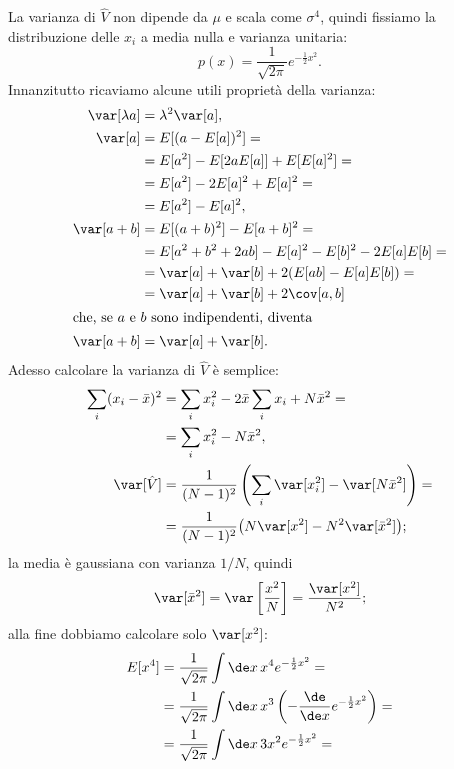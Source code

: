 \begin{solution}
	La varianza di $\hat V$ non dipende da $\mu$ e scala come $\sigma^4$,
	quindi fissiamo la distribuzione delle $x_i$ a media nulla e varianza unitaria:
	\begin{equation*}
		p(x) = \frac1{\sqrt{2\pi}} e^{-\frac12 x^2}.
	\end{equation*}
	Innanzitutto ricaviamo alcune utili proprietà della varianza:
	\begin{align*}
		\var[\lambda a] &= \lambda^2 \var[a], \\
		\var[a]
		&= E[(a-E[a])^2] = \\
		&= E[a^2] - E[2aE[a]] + E[E[a]^2] = \\
		&= E[a^2] - 2E[a]^2 + E[a]^2 = \\
		&= E[a^2] - E[a]^2, \\
		\var[a+b]
		&= E[(a+b)^2] - E[a+b]^2 = \\
		&= E[a^2 + b^2 + 2ab] - E[a]^2 - E[b]^2 - 2E[a]E[b] = \\
		&= \var[a] + \var[b] + 2(E[ab] - E[a]E[b]) = \\
		&= \var[a] + \var[b] + 2\cov[a,b] \\
		\intertext{che, se $a$ e $b$ sono indipendenti, diventa}
		\var[a+b] &= \var[a] + \var[b].
	\end{align*}
	Adesso calcolare la varianza di $\hat V$ è semplice:
	\begin{align*}
		\sum_i (x_i-\bar x)^2
		&= \sum_ix_i^2 - 2\bar x\sum_ix_i + N\bar x^2 = \\
		&= \sum_ix_i^2 - N\bar x^2, \\
		\var[\hat V]
		&= \frac1{(N-1)^2} \left( \sum_i\var[x_i^2] - \var[N\bar x^2] \right) = \\
		&= \frac1{(N-1)^2} \big( N\var[x^2] - N^2\var[\bar x^2] \big);
	\end{align*}
	la media è gaussiana con varianza $1/N$, quindi
	\begin{align*}
		\var[\bar x^2]
		= \var \left[ \frac{x^2}N \right ]
		= \frac{\var[x^2]}{N^2};
	\end{align*}
	alla fine dobbiamo calcolare solo $\var[x^2]$:
	\begin{align*}
		E[x^4]
		&= \frac1{\sqrt{2\pi}} \int\de x\, x^4 e^{-\frac12 x^2} = \\
		&= \frac1{\sqrt{2\pi}} \int\de x\, x^3 \left (-\frac{\de}{\de x} e^{-\frac12 x^2} \right) = \\
		&= \frac1{\sqrt{2\pi}} \int\de x\, 3x^2 e^{-\frac12 x^2} = \\

\end{align*}
\end{solution}

